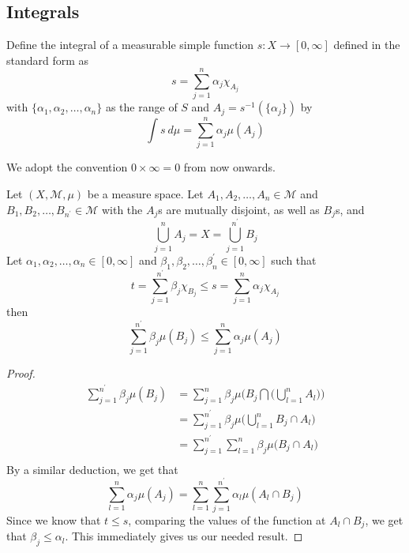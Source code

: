
\chapter{}

\section{Integrals}

\begin{definition}
  Define the integral of a measurable simple function $s: X \to [0, \infty]$ defined in the standard form as \[
      s = \sum_{j = 1}^{n} \alpha_j \chi_{A_j}
  \]
  with $\{ \alpha_1, \alpha_2, \ldots, \alpha_n \}$ as the range of $S$ and $A_j = s^{-1}(\{ \alpha_j \})$ by \[
    \int s \ d \mu = \sum_{j = 1}^{n} \alpha_j \mu(A_j)
  \]
\end{definition}
We adopt the convention $0\times \infty = 0$ from now onwards.

\begin{lemma}
  Let $(X, \mathcal{M}, \mu)$ be a measure space. Let $A_1 , A_2 , \ldots , A_n \in \mathcal{M}$ and $B_1 , B_2 , \ldots , B_{n^\prime} \in \mathcal{M}$ with the $A_j$s are mutually disjoint, as well as $B_j$s, and \[
      \bigcup_{j = 1}^{n}A_j = X = \bigcup_{j = 1}^{n^\prime}B_j
  \]
  Let $\alpha_1 , \alpha_2 , \ldots , \alpha_n \in [0, \infty]$ and $  \beta_1 , \beta_2 , \ldots , \beta_n^\prime \in [0, \infty]$ such that \[
        t = \sum_{j = 1}^{n^\prime} \beta_j \chi_{B_j} \le s = \sum_{j = 1}^{n} \alpha_j \chi_{A_j}
  \]
  then \[
    \sum_{j = 1}^{n^\prime} \beta_j \mu(B_j) \le \sum_{j = 1}^{n} \alpha_j \mu(A_j)
  \]
\end{lemma}
\begin{proof}
  \begin{align*}
    \sum_{j = 1}^{n^\prime} \beta_j \mu(B_j) &=  \sum_{j = 1}^{n} \beta_j \mu\Big(B_j \bigcap \big(\bigcup_{l = 1}^{n} A_l\big)\Big) \\ 
    &= \sum_{j = 1}^{n^\prime} \beta_j \mu \Big(\bigcup_{l = 1}^{n}B_j \cap A_l\Big) \\ 
    &= \sum_{ j = 1}^{n^\prime} \sum_{l = 1}^{n} \beta_j\mu \Big( B_j \cap A_l\Big) \\ 
  \end{align*}
  By a similar deduction, we get that \[
    \sum_{l = 1}^{n} \alpha_j \mu(A_j) = \sum_{ l = 1}^{n} \sum_{j = 1}^{n^\prime} \alpha_l \mu(A_l \cap B_j)
  \]
  Since we know that $t \le s$, comparing the values of the function at $A_l \cap B_j$, we get that $\beta_j \le \alpha_l$. This immediately gives us our needed result.
\end{proof}

